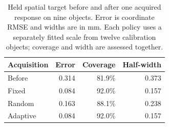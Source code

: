 \begin{table}[t]
\centering\small\setlength{\tabcolsep}{3pt}
\begin{tabular}{lrrr}
\toprule
Acquisition & Error & Coverage & Half-width \\
\midrule
Before & 0.314 & 81.9\% & 0.373 \\
Fixed & 0.084 & 92.0\% & 0.157 \\
Random & 0.163 & 88.1\% & 0.238 \\
Adaptive & 0.084 & 92.0\% & 0.157 \\
\bottomrule
\end{tabular}
\caption{Held spatial target before and after one acquired response on nine objects. Error is coordinate RMSE and widths are in mm. Each policy uses a separately fitted scale from twelve calibration objects; coverage and width are assessed together.}
\label{tab:active}
\end{table}
